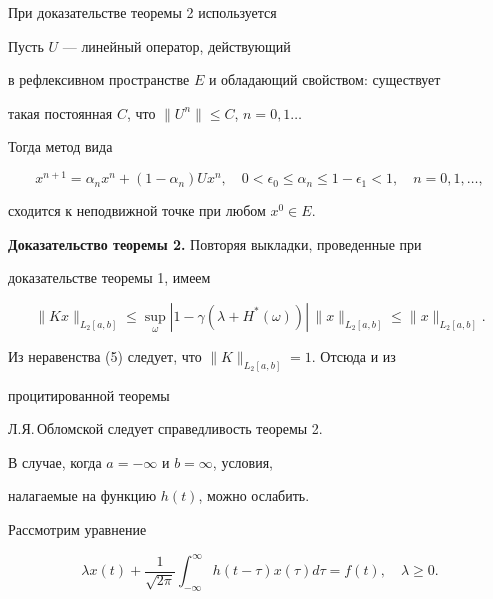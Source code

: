 При доказательстве теоремы 2 используется





\begin{thmnonum}


Пусть $U$ --- линейный оператор, действующий


в рефлексивном пространстве $E$ и обладающий свойством: существует


такая постоянная $C$, что $\|U^n\| \le C$, $n=0,1\dotsc$


Тогда метод вида


$$


x^{n+1}=\alpha_n x^n+(1-\alpha_n) U x^n, \quad


0<\epsilon_0 \le \alpha_n \le 1-\epsilon_1<1,\quad n=0,1,\dotsc,


$$


сходится к неподвижной точке при любом $x^0\in E$.


\end{thmnonum}





{\bf Доказательство теоремы 2.} Повторяя выкладки, проведенные при


доказательстве теоремы 1, имеем


\begin{equation}


\|Kx\|_{L_2[a,b]}\le \sup_\omega


|1-\gamma (\lambda + H^*(\omega))|\,


\|x\|_{L_2[a,b]}\le\|x\|_{L_2[a,b]}.


\end{equation}


Из неравенства (5) следует, что $\|K\|_{L_2[a,b]}=1$. Отсюда и из


процитированной теоремы


Л.Я.\,Об\-ломской следует справедливость теоремы 2.





В случае, когда $a=-\infty$ и $b=\infty$, условия,


налагаемые на функцию $h(t)$, можно ослабить.





Рассмотрим уравнение


\begin{equation}


\lambda x(t) +\frac{1}{{\sqrt { 2\pi }}}


\int_{-\infty}^\infty h(t-\tau) x(\tau) d\tau =


f(t), \quad \lambda\ge 0.


\end{equation}





